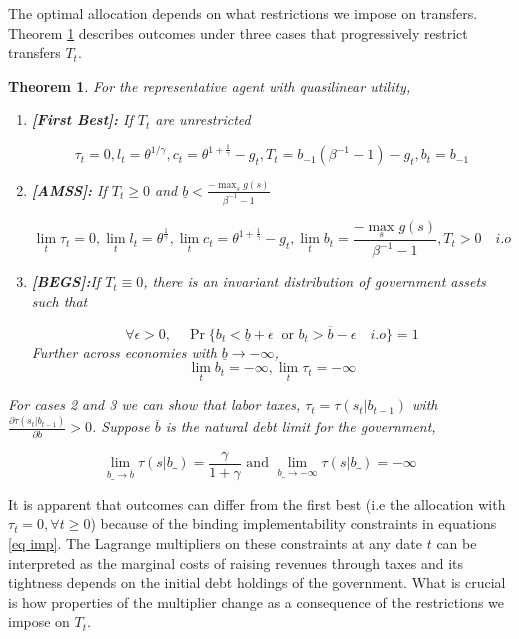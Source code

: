 \documentclass[thmsb,11pt]{article}
\newtheorem{theorem}{Theorem}
\begin{document}
The optimal allocation depends on what restrictions we impose on transfers. Theorem \ref{thm rep agent} describes outcomes under three cases that progressively restrict transfers $T_t$. 


\begin{theorem}
\label{thm rep agent}
For the representative agent with quasilinear utility,

\begin{enumerate}


\item \textbf{[First Best]:} If $T_t$ are unrestricted

\[\tau_t=0,l_t=\theta^{1/\gamma},c_t=\theta^{1+ \frac{1}{\gamma}}-g_t,T_t=b_{-1}(\beta^{-1}-1)-g_t,b_t=b_{-1}\]


\item \textbf{[AMSS]:} If $T_t\geq 0$ and $\underline{b}<\frac{-\max_{s}g(s)}{\beta^{-1}-1}$

\[\lim_t \tau_t=0, \lim_t l_t=\theta^{\frac{1}{\gamma}},\lim_t c_t=\theta^{1+ \frac{1}{\gamma}}-g_t, \lim_t b_t=\frac{-\max_{s}g(s)}{\beta^{-1}-1}, T_t>0 \quad i.o\]
\item \textbf{[BEGS]:}If $T_t\equiv 0$, there is an invariant distribution of government assets such that

\[\forall \epsilon>0, \quad \Pr\{b_t<\underline{b}+\epsilon  \ \text{ or } b_t>\overline{b}-\epsilon \quad i.o \}=1\]
Further across economies with $\underline{b}\to -\infty$,
\[\lim_t b_t=-\infty, \lim_t \tau_t=-\infty\]

\end{enumerate}
For cases 2 and 3 we can show that labor taxes, $\tau_t=\tau(s_t|b_{t-1})$ with $\frac{\partial  \tau(s_{t}|b_{t-1})}{\partial b}>0$. Suppose $\overline{b}$ is the natural debt limit for the government, 

\[\lim_{b\_ \to \overline{b}}\tau (s
|b\_)=\frac{\gamma}{1+\gamma} \text{ and } \lim_{b\_ \to -\infty}\tau (s|b\_)=-\infty\]

\end{theorem}
It is apparent that outcomes can differ from the first best (i.e the allocation with $\tau_t=0, \forall t\geq0$) because of the binding implementability constraints in equations \ref{eq imp}. The Lagrange multipliers on these constraints at any date $t$ can be interpreted as the marginal costs of raising revenues through taxes and its tightness depends on the initial debt holdings of the government. What is crucial is how  properties of the multiplier change as a consequence of the restrictions we impose on  $T_t$. 
\end{document}
